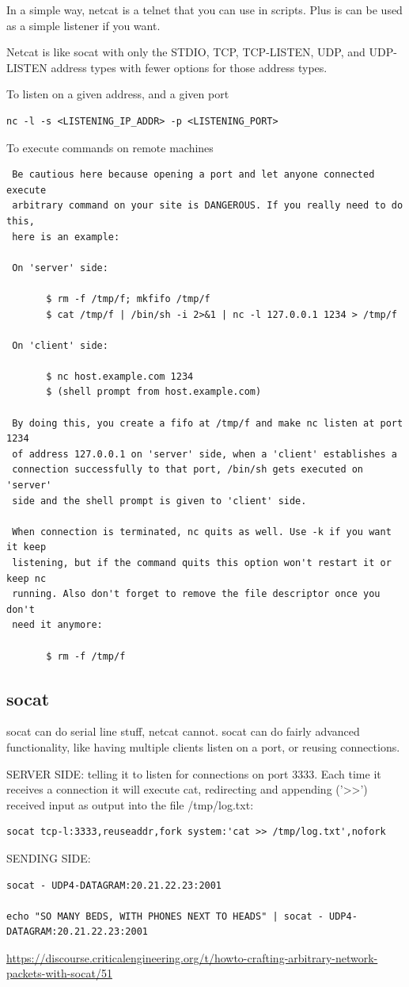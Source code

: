 In a simple way, netcat is a telnet that you can use in scripts. Plus is can be
used as a simple listener if you want.

Netcat is like socat with only the STDIO, TCP, TCP-LISTEN, UDP, and UDP-LISTEN
address types with fewer options for those address types.

To listen on a given address, and a given port
\begin{verbatim}
nc -l -s <LISTENING_IP_ADDR> -p <LISTENING_PORT>
\end{verbatim}

To execute commands on remote machines
\begin{verbatim}
 Be cautious here because opening a port and let anyone connected execute
 arbitrary command on your site is DANGEROUS. If you really need to do this,
 here is an example:

 On 'server' side:

       $ rm -f /tmp/f; mkfifo /tmp/f
       $ cat /tmp/f | /bin/sh -i 2>&1 | nc -l 127.0.0.1 1234 > /tmp/f

 On 'client' side:

       $ nc host.example.com 1234
       $ (shell prompt from host.example.com)

 By doing this, you create a fifo at /tmp/f and make nc listen at port 1234
 of address 127.0.0.1 on 'server' side, when a 'client' establishes a
 connection successfully to that port, /bin/sh gets executed on 'server'
 side and the shell prompt is given to 'client' side.

 When connection is terminated, nc quits as well. Use -k if you want it keep
 listening, but if the command quits this option won't restart it or keep nc
 running. Also don't forget to remove the file descriptor once you don't
 need it anymore:

       $ rm -f /tmp/f
\end{verbatim}

\subsection{socat}
\label{sec:socat}



socat can do serial line stuff, netcat cannot. socat can do fairly advanced
functionality, like having multiple clients listen on a port, or reusing connections. 

SERVER SIDE:  telling it to listen for connections on port 3333. Each time it
receives a connection it will execute cat, redirecting and appending ('>>')
received input as output into the file /tmp/log.txt: 
\begin{verbatim}
socat tcp-l:3333,reuseaddr,fork system:'cat >> /tmp/log.txt',nofork
\end{verbatim}

SENDING SIDE:
\begin{verbatim}
socat - UDP4-DATAGRAM:20.21.22.23:2001

echo "SO MANY BEDS, WITH PHONES NEXT TO HEADS" | socat - UDP4-DATAGRAM:20.21.22.23:2001
\end{verbatim}

\url{https://discourse.criticalengineering.org/t/howto-crafting-arbitrary-network-packets-with-socat/51}